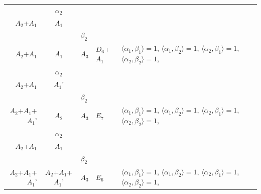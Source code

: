 \documentclass[12pt]{report}
\begin{document}
\begin{appendix}
{\begin{longtable}{rcl p{1cm}p{1cm}p{3cm} }
\begin{tabular}{cc}$\alpha_1$+ & $\alpha_2$\\\tiny{ $A_2$+$A_1$ } & \tiny{ $A_1$ }\end{tabular} &\begin{tabular}{c} = \\~ \end{tabular} & \begin{tabular}{cc}$\beta_1$+ & $\beta_2$\\\tiny{ $A_2$+$A_1$ } & \tiny{ $A_1$ }\end{tabular} & $A_3$ & $D_6$+$A_1$ &  $\langle\alpha_1, \beta_1\rangle=1$, $\langle\alpha_1, \beta_2\rangle=1$, $\langle\alpha_2, \beta_1\rangle=1$, $\langle\alpha_2, \beta_2\rangle=1$, 
\\
\begin{tabular}{cc}$\alpha_1$+ & $\alpha_2$\\\tiny{ $A_2$+$A_1$ } & \tiny{ $A_1$' }\end{tabular} &\begin{tabular}{c} = \\~ \end{tabular} & \begin{tabular}{cc}$\beta_1$+ & $\beta_2$\\\tiny{ $A_2$+$A_1$+$A_1$' } & \tiny{ $A_2$ }\end{tabular} & $A_3$ & $E_7$ &  $\langle\alpha_1, \beta_1\rangle=1$, $\langle\alpha_1, \beta_2\rangle=1$, $\langle\alpha_2, \beta_1\rangle=1$, $\langle\alpha_2, \beta_2\rangle=1$, 
\\
\begin{tabular}{cc}$\alpha_1$+ & $\alpha_2$\\\tiny{ $A_2$+$A_1$ } & \tiny{ $A_1$ }\end{tabular} &\begin{tabular}{c} = \\~ \end{tabular} & \begin{tabular}{cc}$\beta_1$+ & $\beta_2$\\\tiny{ $A_2$+$A_1$+$A_1$' } & \tiny{ $A_2$+$A_1$+$A_1$' }\end{tabular} & $A_3$ & $E_6$ &  $\langle\alpha_1, \beta_1\rangle=1$, $\langle\alpha_1, \beta_2\rangle=1$, $\langle\alpha_2, \beta_1\rangle=1$, $\langle\alpha_2, \beta_2\rangle=1$, 
\\

\end{longtable}}
\end{appendix}
\end{document}
